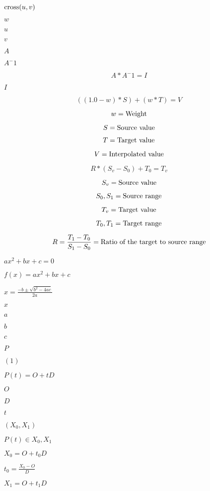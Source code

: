 \documentclass{article}
\begin{document}
$\textnormal{cross}(u,v)$
\pagebreak

$w$
\pagebreak

$u$
\pagebreak

$v$
\pagebreak

$A$
\pagebreak

$A^-1$
\pagebreak

\[ A * A^-1 = I \]
\pagebreak

$I$
\pagebreak

\[ ((1.0-w)*S)+(w*T)=V \]
\pagebreak

\[ w=\textnormal{Weight} \]
\pagebreak

\[ S=\textnormal{Source value} \]
\pagebreak

\[ T=\textnormal{Target value} \]
\pagebreak

\[ V=\textnormal{Interpolated value} \]
\pagebreak

\[ R*(S_v-S_0)+T_0=T_v\]
\pagebreak

\[ S_v=\textnormal{Source value} \]
\pagebreak

\[ S_0,S_1=\textnormal{Source range} \]
\pagebreak

\[ T_v=\textnormal{Target value} \]
\pagebreak

\[ T_0,T_1=\textnormal{Target range} \]
\pagebreak

\[ R=\frac{T_1-T_0}{S_1-S_0}=\textnormal{Ratio of the target to source range} \]
\pagebreak

$ax^2+bx+c=0$
\pagebreak

$f(x)=ax^2+bx+c$
\pagebreak

$x=\frac{-b\pm\sqrt{b^2-4ac}}{2a}$
\pagebreak

$x$
\pagebreak

$a$
\pagebreak

$b$
\pagebreak

$c$
\pagebreak

$P$
\pagebreak

$(1)$
\pagebreak

$P(t)=O+tD$
\pagebreak

$O$
\pagebreak

$D$
\pagebreak

$t$
\pagebreak

$(X_0,X_1)$
\pagebreak

$P(t)\in{X_0,X_1}$
\pagebreak

$X_0=O+t_0D$
\pagebreak

$t_0=\frac{X_0-O}{D}$
\pagebreak

$X_1=O+t_1D$
\pagebreak
\end{document}
